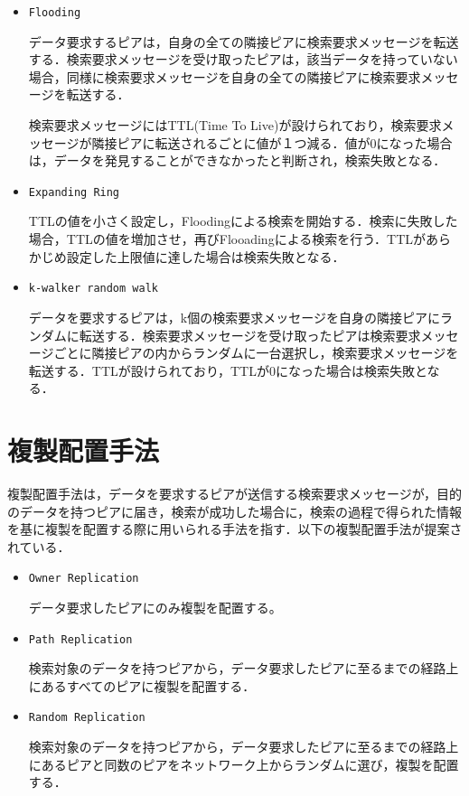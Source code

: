 \documentclass[11pt]{jreport}
\begin{document}
\begin{itemize}
	\item {\tt Flooding}
	\par データ要求するピアは，自身の全ての隣接ピアに検索要求メッセージを転送する．検索要求メッセージを受け取ったピアは，該当データを持っていない場合，同様に検索要求メッセージを自身の全ての隣接ピアに検索要求メッセージを転送する．
	\par 検索要求メッセージにはTTL(Time To Live)が設けられており，検索要求メッセージが隣接ピアに転送されるごとに値が１つ減る．値が0になった場合は，データを発見することができなかったと判断され，検索失敗となる．
	
	\item {\tt Expanding Ring}
	\par TTLの値を小さく設定し，Floodingによる検索を開始する．検索に失敗した場合，TTLの値を増加させ，再びFlooadingによる検索を行う．TTLがあらかじめ設定した上限値に達した場合は検索失敗となる．
	
	\item {\tt k-walker random walk}
	\par データを要求するピアは，k個の検索要求メッセージを自身の隣接ピアにランダムに転送する．検索要求メッセージを受け取ったピアは検索要求メッセージごとに隣接ピアの内からランダムに一台選択し，検索要求メッセージを転送する．TTLが設けられており，TTLが0になった場合は検索失敗となる．
\end{itemize}

\section{複製配置手法}
複製配置手法は，データを要求するピアが送信する検索要求メッセージが，目的のデータを持つピアに届き，検索が成功した場合に，検索の過程で得られた情報を基に複製を配置する際に用いられる手法を指す．以下の複製配置手法が提案されている\cite{maruta}．

\begin{itemize}
  \item {\tt Owner Replication}
  \par データ要求したピアにのみ複製を配置する。

  \item {\tt Path Replication}
  \par 検索対象のデータを持つピアから，データ要求したピアに至るまでの経路上にあるすべてのピアに複製を配置する．

  \item {\tt Random Replication}
  \par 検索対象のデータを持つピアから，データ要求したピアに至るまでの経路上にあるピアと同数のピアをネットワーク上からランダムに選び，複製を配置する．
\end{itemize}
\end{document}
